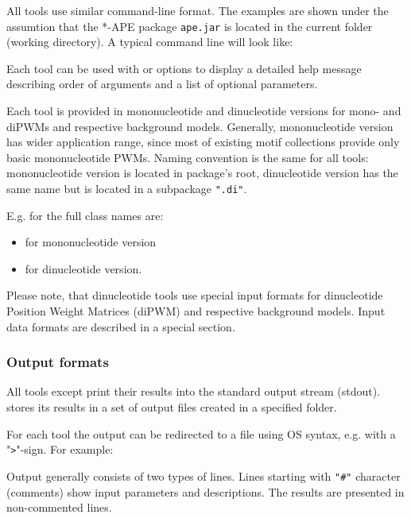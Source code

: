 All tools use similar command-line format. The examples are shown under the assumtion that the *-APE package \texttt{ape.jar} is located in the current folder (working directory). A typical command line will look like:\par
\texttt{}

Each tool can be used with  or  options to display a detailed help message describing order of arguments and a list of optional parameters.

Each tool is provided in mononucleotide and dinucleotide versions for mono- and diPWMs and respective background models.
Generally, mononucleotide version has wider application range, since most of existing motif collections provide only basic mononucleotide PWMs.
Naming convention is the same for all tools: mononucleotide version is located in package's root, dinucleotide version has the same name but is located in a subpackage \texttt{".di"}.

E.g. for  the full class names are:
\begin{itemize}
\item{} for mononucleotide version
\item{} for dinucleotide version.
\end{itemize}

Please note, that dinucleotide tools use special input formats for dinucleotide Position Weight Matrices (diPWM) and respective background models. Input data formats are described in a special section.


\subsubsection{Output formats}

All tools except  print their results into the standard output stream (stdout).
 stores its results in a set of output files created in a specified folder.

For each tool the output can be redirected to a file using OS syntax, e.g. with a "\texttt{\textgreater}"-sign. For example:
\texttt{}

Output generally consists of two types of lines. Lines starting with \texttt{"\#"} character (comments) show
input parameters and descriptions. The results are presented in non-commented lines.
